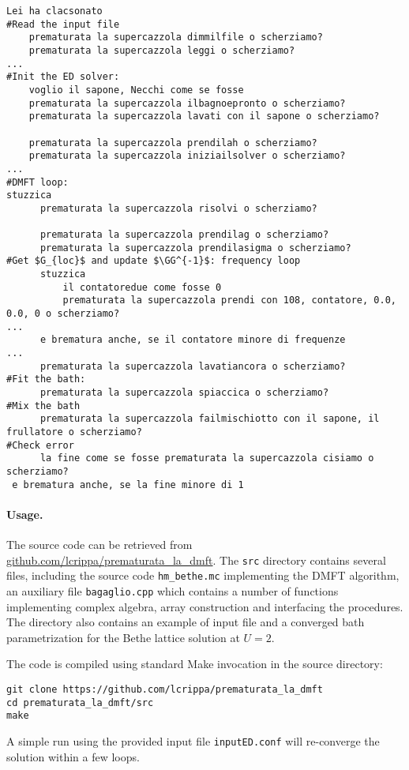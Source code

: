 \documentclass[edipack_sp.tex]{subfiles}
\begin{document}
\begin{lstlisting}[style=MonicelliStyle,numbers=none]
Lei ha clacsonato
#Read the input file
    prematurata la supercazzola dimmilfile o scherziamo?
    prematurata la supercazzola leggi o scherziamo? 
...                                                  
#Init the ED solver:
    voglio il sapone, Necchi come se fosse
    prematurata la supercazzola ilbagnoepronto o scherziamo?
    prematurata la supercazzola lavati con il sapone o scherziamo?
        
    prematurata la supercazzola prendilah o scherziamo?
    prematurata la supercazzola iniziailsolver o scherziamo?
...
#DMFT loop:
stuzzica    
      prematurata la supercazzola risolvi o scherziamo?
      
      prematurata la supercazzola prendilag o scherziamo?
      prematurata la supercazzola prendilasigma o scherziamo?
#Get $G_{loc}$ and update $\GG^{-1}$: frequency loop
      stuzzica                   
          il contatoredue come fosse 0
          prematurata la supercazzola prendi con 108, contatore, 0.0, 0.0, 0 o scherziamo?
...
      e brematura anche, se il contatore minore di frequenze
...      
      prematurata la supercazzola lavatiancora o scherziamo?
#Fit the bath:       
      prematurata la supercazzola spiaccica o scherziamo?
#Mix the bath           
      prematurata la supercazzola failmischiotto con il sapone, il frullatore o scherziamo?
#Check error      
      la fine come se fosse prematurata la supercazzola cisiamo o scherziamo?         
 e brematura anche, se la fine minore di 1
\end{lstlisting}

\paragraph{Usage.}
The source code can be retrieved from
\href{https://github.com/lcrippa/prematurata_la_dmft}{github.com/lcrippa/prematurata\_la\_dmft}. 
The {\tt src} directory contains several files, including the source
code {\tt hm\_bethe.mc} implementing the DMFT algorithm, an auxiliary file {\tt bagaglio.cpp} which
contains a number of functions implementing complex algebra, array
construction and interfacing the \NAME procedures. The directory also
contains an example of input file and a converged bath parametrization
for the Bethe lattice solution at $U=2$.

The code is compiled using standard Make invocation in the source
directory:
\begin{lstlisting}[style=mybash,numbers=none]
git clone https://github.com/lcrippa/prematurata_la_dmft
cd prematurata_la_dmft/src
make
\end{lstlisting}
A simple run using the provided input file {\tt inputED.conf} will
re-converge the solution within a few loops. 

\ifSubfilesClassLoaded{
  
}{}
\end{document}

